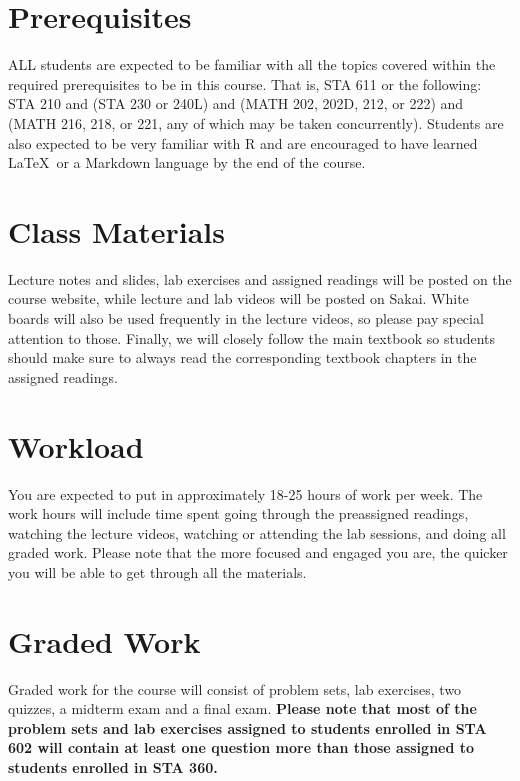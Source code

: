 \documentclass[11pt, a4paper]{article}
\begin{document}
\section{Prerequisites}
ALL students are expected to be familiar with all the topics covered within the required prerequisites to be in this course. That is, STA 611 or the following: STA 210 and (STA 230 or 240L) and (MATH 202, 202D, 212, or 222) and (MATH 216, 218, or 221, any of which may be taken concurrently). Students are also expected to be very familiar with \textsf{R} and are encouraged to have learned \LaTeX \ or a Markdown language by the end of the course.


\section{Class Materials}
Lecture notes and slides, lab exercises and assigned readings will be posted on the course website, while lecture and lab videos will be posted on Sakai. White boards will also be used frequently in the lecture videos, so please pay special attention to those. Finally, we will closely follow the main textbook so students should make sure to always read the corresponding textbook chapters in the assigned readings.

\section{Workload}
You are expected to put in approximately 18-25 hours of work per week. %
The work hours will include time spent going through the preassigned readings, watching the lecture videos, watching or attending the lab sessions, and doing all graded work. Please note that the more focused and engaged you are, the quicker you will be able to get through all the materials.

\section{Graded Work} 
Graded work for the course will consist of problem sets, lab exercises, two quizzes, a midterm exam and a final exam. \textbf{Please note that most of the problem sets and lab exercises assigned to students enrolled in STA 602 will contain at least one question more than those assigned to students enrolled in STA 360. }
\end{document}

